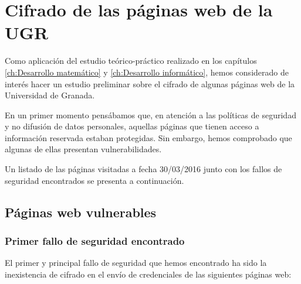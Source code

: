 \chapter{Cifrado de las páginas web de la UGR}


Como aplicación del estudio teórico-práctico realizado en los capítulos \ref{ch:Desarrollo matemático} y \ref{ch:Desarrollo informático}, hemos considerado de interés hacer un estudio preliminar sobre el cifrado de algunas páginas web de la Universidad de Granada.

En un primer momento pensábamos que, en atención a las políticas de seguridad y no difusión de datos personales, aquellas páginas que tienen acceso a información reservada estaban protegidas. Sin embargo, hemos comprobado que algunas de ellas presentan vulnerabilidades.

Un listado de las páginas visitadas a fecha 30/03/2016 junto con los fallos de seguridad encontrados se presenta a continuación.

\section*{Páginas web vulnerables}

\subsection*{Primer fallo de seguridad encontrado}

El primer y principal fallo de seguridad que hemos encontrado ha sido la inexistencia de cifrado en el envío de credenciales de las siguientes páginas web:

